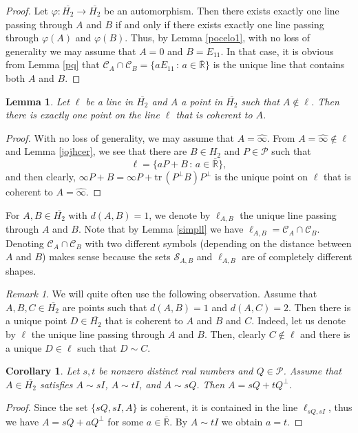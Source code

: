 \documentclass[10pt]{amsart}
\newtheorem{lemma}[theorem]{Lemma}
\newtheorem{corollary}[theorem]{Corollary}
\theoremstyle{definition}
\theoremstyle{remark}
\newtheorem{remark}[theorem]{Remark}
\numberwithin{subsection}{section}
\numberwithin{equation}{section}
\newcommand\cC{{\mathcal{C}}}
\newcommand\oH{{\overline{H_2}}}
\newcommand\oi{{\widehat{\infty}}}
\newcommand\oR{{\overline{\mathbb{R}}}}
\begin{document}
\begin{proof}
Let $\varphi \colon \oH \to \oH$ be an automorphism. Then there exists exactly one line passing through $A$ and $B$ if and only if there exists exactly one line passing through $\varphi(A)$ and $\varphi(B)$. Thus, by Lemma \ref{pocelo1},
with no loss of generality we may assume that $A=0$ and $B=E_{11}$. 
In that case, it is obvious from Lemma \ref{pq} that $\cC_A\cap\cC_B = \{ a E_{11} \, : \, a\in {\oR} \}$ is the unique line that contains both $A$ and $B$.
\end{proof}

\begin{lemma}\label{simplll}
Let $\ell$ be a line in $\oH$ and $A$ a point in $\oH$ such that $A\not\in \ell$. Then there is exactly one point on the line $\ell$ that is coherent to $A$.
\end{lemma}

\begin{proof}
With no loss of generality, we may assume that $A = \oi$. 
From $A = \oi \not\in \ell$ and Lemma \ref{jojhcer}, we see that there are
$B\in H_2$ and $P \in \mathcal{P}$ such that
\[
\ell = \{ aP+B  \, : \, a \in \oR \},
\]
and then clearly, $\infty P+B = \infty P + \mathrm{tr}\, (P^\perp B) P^\perp$ is the unique point on $\ell$ that is coherent to $A = \oi$.
\end{proof}



For $A,B \in \oH$ with $d(A,B) = 1$, we denote by $\ell_{A,B}$  the unique line passing through $A$ and $B$. Note that by Lemma \ref{simpll} we have $\ell_{A,B} = \mathcal{C}_A \cap \mathcal{C}_B$. 
Denoting $\mathcal{C}_A \cap \mathcal{C}_B$ with two different symbols (depending on the distance between $A$ and $B$) makes sense because the sets $\mathcal{S}_{A,B}$ and $\ell_{A,B}$ are of completely different shapes. 

\begin{remark}\label{ceruk}
We will quite often use the following observation. Assume that $A,B,C \in \oH$ are points such that $d(A,B) =1$ and $d(A,C) =2$. Then there is a unique point $D \in \oH$ that is coherent to $A$ and $B$ and $C$. Indeed, let us denote by $\ell$ the unique line passing through $A$ and $B$. Then, clearly $C \not\in \ell$ and there is a unique $D \in \ell$ such that $D \sim C$.
\end{remark}


\begin{corollary}\label{veryeasy2}
Let $s,t$ be nonzero distinct real numbers and $Q \in \mathcal{P}$. Assume that $A\in \oH$ satisfies $A \sim sI$, $A\sim tI$, and $A\sim sQ$. Then $A = sQ + tQ^\perp$.
\end{corollary} 
\begin{proof}
Since the set $\{sQ, sI, A\}$ is coherent, it is contained in the line $\ell_{sQ,sI}$, thus we have $A = sQ + aQ^\perp$ for some $a\in {\oR}$. 
By $A\sim tI$ we obtain $a=t$.
\end{proof}
\end{document}
